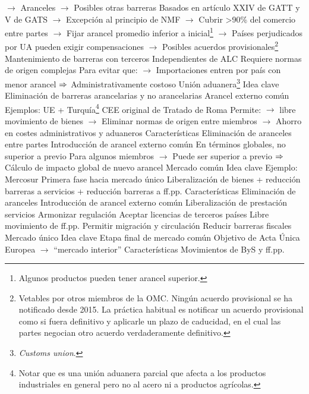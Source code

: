 \documentclass{nuevotema}
\begin{document}
\begin{esquemal}
				\4[] $\to$ Aranceles
				\4[] $\to$ Posibles otras barreras
				\4 Basados en artículo XXIV de GATT y V de GATS
				\4[] $\to$ Excepción al principio de NMF
				\4[] $\to$ Cubrir >90\% del comercio entre partes
				\4[] $\to$ Fijar arancel promedio inferior a inicial\footnote{Algunos productos pueden tener arancel superior.}
				\4[] $\to$ Países perjudicados por UA pueden exigir compensaciones
				\4[] $\to$ Posibles acuerdos provisionales\footnote{Vetables por otros miembros de la OMC. Ningún acuerdo provisional se ha notificado desde 2015. La práctica habitual es notificar un acuerdo provisional como si fuera definitivo y aplicarle un plazo de caducidad, en el cual las partes negocian otro acuerdo verdaderamente definitivo.}
				\4 Mantenimiento de barreras con terceros
				\4[] Independientes de ALC
				\4 Requiere normas de origen complejas
				\4[] Para evitar que:
				\4[] $\to$ Importaciones entren por país con menor arancel
				\4[] $\Rightarrow$ Administrativamente costoso
		\2 Unión aduanera\footnote{\textit{Customs union}.}
			\3 Idea clave
				\4 Eliminación de barreras arancelarias y no arancelarias
				\4 Arancel externo común
				\4 Ejemplos:
				\4[] UE + Turquía\footnote{Notar que es una unión aduanera parcial que afecta a los productos industriales en general pero no al acero ni a productos agrícolas.}
				\4[] CEE original de Tratado de Roma
				\4 Permite:
				\4[] $\to$ libre movimiento de bienes
				\4[] $\to$ Eliminar normas de origen entre miembros
				\4[] $\to$ Ahorro en costes administrativos y aduaneros
			\3 Características
				\4 Eliminación de aranceles entre partes
				\4 Introducción de arancel externo común
				\4[] En términos globales, no superior a previo
				\4[] Para algunos miembros
				\4[] $\to$ Puede ser superior a previo
				\4[] $\Rightarrow$ Cálculo de impacto global de nuevo arancel
		\2 Mercado común
			\3 Idea clave
				\4 Ejemplo:
				\4[] Mercosur
				\4 Primera fase hacia mercado único
				\4 Liberalización de bienes
				\4[] + reducción barreras a servicios
				\4[] + reducción barreras a ff.pp.
			\3 Características
				\4 Eliminación de aranceles
				\4 Introducción de arancel externo común
				\4 Liberalización de prestación servicios
				\4[] Armonizar regulación
				\4[] Aceptar licencias de terceros países
				\4 Libre movimiento de ff.pp.
				\4[] Permitir migración y circulación
				\4[] Reducir barreras fiscales
		\2 Mercado único
			\3 Idea clave
				\4 Etapa final de mercado común
				\4 Objetivo de Acta Única Europea
				\4[] $\to$ ``mercado interior''
			\3 Características
				\4 Movimientos de ByS y ff.pp.

\end{esquemal}
\end{document}
